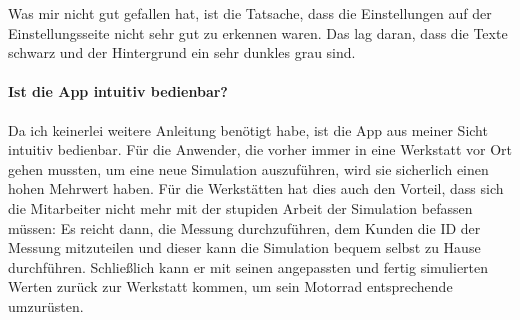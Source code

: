 		Was mir nicht gut gefallen hat, ist die Tatsache, dass die Einstellungen auf der Einstellungsseite nicht sehr gut zu erkennen waren. Das lag daran, dass die Texte schwarz und der Hintergrund ein sehr dunkles grau sind.	
	
	\paragraph{Ist die App intuitiv bedienbar?}
		
		Da ich keinerlei weitere Anleitung benötigt habe, ist die App aus meiner Sicht intuitiv bedienbar. Für die Anwender, die vorher immer in eine Werkstatt vor Ort gehen mussten, um eine neue Simulation auszuführen, wird sie sicherlich einen hohen Mehrwert haben. Für die Werkstätten hat dies auch den Vorteil, dass sich die Mitarbeiter nicht mehr mit der stupiden Arbeit der Simulation befassen müssen: Es reicht dann, die Messung durchzuführen, dem Kunden die ID der Messung mitzuteilen und dieser kann die Simulation bequem selbst zu Hause durchführen. Schließlich kann er mit seinen angepassten und fertig simulierten Werten zurück zur Werkstatt kommen, um sein Motorrad entsprechende umzurüsten.

